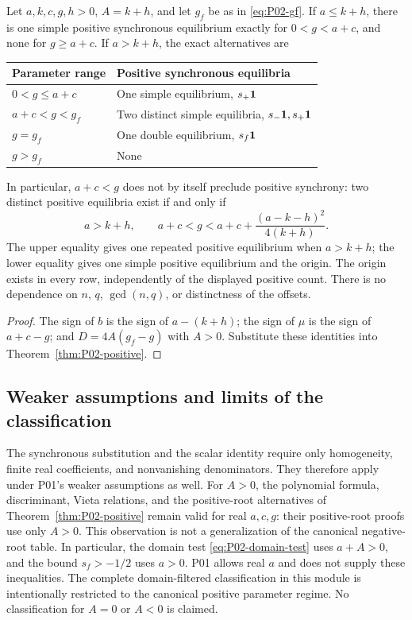 \begin{corollary}
\label{cor:P02-canonical}
Let $a,k,c,g,h>0$, $A=k+h$, and let $g_f$ be as in
\eqref{eq:P02-gf}. If $a\le k+h$, there is one simple positive
synchronous equilibrium exactly for $0<g<a+c$, and none for
$g\ge a+c$. If $a>k+h$, the exact alternatives are
\begin{center}
\begin{tabular}{@{}ll@{}}
\toprule
Parameter range & Positive synchronous equilibria\\
\midrule
$0<g\le a+c$ & One simple equilibrium, $s_+\mathbf{1}$\\
$a+c<g<g_f$ & Two distinct simple equilibria, $s_-\mathbf{1},s_+\mathbf{1}$\\
$g=g_f$ & One double equilibrium, $s_f\mathbf{1}$\\
$g>g_f$ & None\\
\bottomrule
\end{tabular}
\end{center}
In particular, $a+c<g$ does not by itself preclude positive
synchrony: two distinct positive equilibria exist if and only if
\begin{equation}
\label{eq:P02-two-positive-original}
 a>k+h,\qquad
 a+c<g<a+c+\frac{(a-k-h)^2}{4(k+h)}.
\end{equation}
The upper equality gives one repeated positive equilibrium when
$a>k+h$; the lower equality gives one simple positive equilibrium
and the origin. The origin exists in every row, independently of
the displayed positive count. There is no dependence on $n$, $q$,
$\gcd(n,q)$, or distinctness of the offsets.
\end{corollary}

\begin{proof}
The sign of $b$ is the sign of $a-(k+h)$; the sign of $\mu$ is
the sign of $a+c-g$; and $D=4A(g_f-g)$ with $A>0$.
Substitute these identities into Theorem~\ref{thm:P02-positive}.
\end{proof}

\subsection{Weaker assumptions and limits of the classification}
The synchronous substitution and the scalar identity require only
homogeneity, finite real coefficients, and nonvanishing denominators.
They therefore apply under P01's weaker assumptions as well.
For $A>0$, the polynomial formula, discriminant, Vieta relations,
and the positive-root alternatives of Theorem~\ref{thm:P02-positive}
remain valid for real $a,c,g$: their positive-root proofs use only
$A>0$. This observation is not a generalization of the canonical
negative-root table. In particular, the domain test
\eqref{eq:P02-domain-test} uses $a+A>0$, and the bound $s_f>-1/2$
uses $a>0$. P01 allows real $a$ and does not supply these inequalities.
The complete domain-filtered classification in this module is
intentionally restricted to the canonical positive parameter regime.
No classification for $A=0$ or $A<0$ is claimed.

